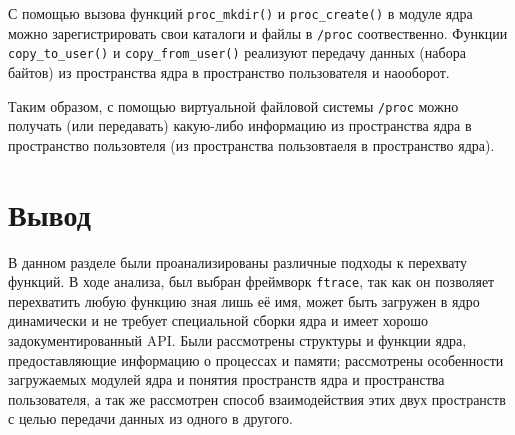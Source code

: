 С помощью вызова функций \texttt{proc\_mkdir()} и \texttt{proc\_create()} в модуле ядра можно зарегистрировать свои каталоги и файлы в \texttt{/proc} соотвественно. Функции \texttt{copy\_to\_user()} и \texttt{copy\_from\_user()} реализуют передачу данных (набора байтов) из пространства ядра в пространство пользователя и наооборот.

Таким образом, с помощью виртуальной файловой системы \texttt{/proc} можно получать (или передавать) какую-либо информацию из пространства ядра в пространство пользовтеля (из пространства пользовтаеля в пространство ядра).

\section*{Вывод}

В данном разделе были проанализированы различные подходы к перехвату функций. В ходе анализа, был выбран фреймворк \texttt{ftrace}, так как он позволяет перехватить любую функцию зная лишь её имя, может быть загружен в ядро динамически и не требует специальной сборки ядра и имеет хорошо задокументированный API. Были рассмотрены структуры и функции ядра, предоставляющие информацию о процессах и памяти; рассмотрены особенности загружаемых модулей ядра и понятия пространств ядра и пространства пользователя, а так же рассмотрен способ взаимодействия этих двух пространств с целью передачи данных из одного в другого.


